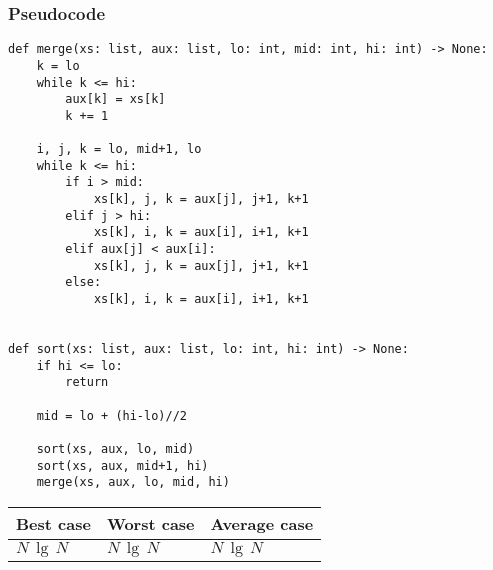 \documentclass[a4paper]{article}
\begin{document}
\subsubsection*{Pseudocode}
\begin{lstlisting}
def merge(xs: list, aux: list, lo: int, mid: int, hi: int) -> None:
    k = lo
    while k <= hi:
        aux[k] = xs[k]
        k += 1

    i, j, k = lo, mid+1, lo
    while k <= hi:
        if i > mid:
            xs[k], j, k = aux[j], j+1, k+1
        elif j > hi:
            xs[k], i, k = aux[i], i+1, k+1
        elif aux[j] < aux[i]:
            xs[k], j, k = aux[j], j+1, k+1
        else:
            xs[k], i, k = aux[i], i+1, k+1


def sort(xs: list, aux: list, lo: int, hi: int) -> None:
    if hi <= lo:
        return

    mid = lo + (hi-lo)//2

    sort(xs, aux, lo, mid)
    sort(xs, aux, mid+1, hi)
    merge(xs, aux, lo, mid, hi)
\end{lstlisting}
\begin{spacing}{1.5}
\begin{tabularx}{1\textwidth}{|X|X|X|}
    \hline
    \textbf{Best case} & \textbf{Worst case} & \textbf{Average case}\\
    \hline
    $N\,\lg\,N$&$N\,\lg\,N$&$N\,\lg\,N$\\
    \hline
\end{tabularx}
\end{spacing}
\end{document}
